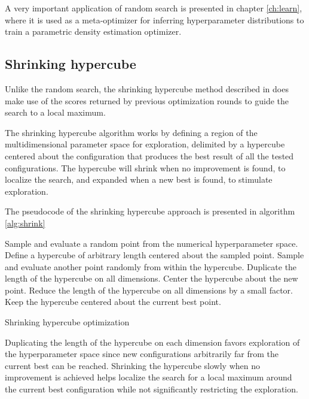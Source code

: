 A very important application of random search is presented in chapter \ref{ch:learn}, where it is
used as a meta-optimizer for inferring hyperparameter distributions to train a parametric density
estimation optimizer.

\subsection{Shrinking hypercube}

Unlike the random search, the shrinking hypercube method described in \cite{Gonnet2010} does make
use of the scores returned by previous optimization rounds to guide the search to a local maximum.

The shrinking hypercube algorithm works by defining a region of the multidimensional parameter space
for exploration, delimited by a hypercube centered about the configuration that produces the best
result of all the tested configurations. The hypercube will shrink when no improvement is found, to
localize the search, and expanded when a new best is found, to stimulate exploration.

The pseudocode of the shrinking hypercube approach is presented in algorithm \ref{alg:shrink}

\begin{algorithm}[here]
	\begin{algorithmic}
		\State Sample and evaluate a random point from the numerical hyperparameter space.
		\State Define a hypercube of arbitrary length centered about the sampled point.
		\State Sample and evaluate another point randomly from within the hypercube.
			\State Duplicate the length of the hypercube on all dimensions.
			\State Center the hypercube about the new point.
		\Else
			\State Reduce the length of the hypercube on all dimensions by a small factor.
			\State Keep the hypercube centered about the current best point.
		\EndIf
		\EndWhile
	\end{algorithmic}
	\caption{Shrinking hypercube optimization}
	\label{alg:shrink}
\end{algorithm}

Duplicating the length of the hypercube on each dimension favors exploration of the
hyperparameter space since new configurations arbitrarily far from the current best can be reached.
Shrinking the hypercube slowly when no improvement is achieved helps localize the search for a local
maximum around the current best configuration while not significantly restricting the exploration.


